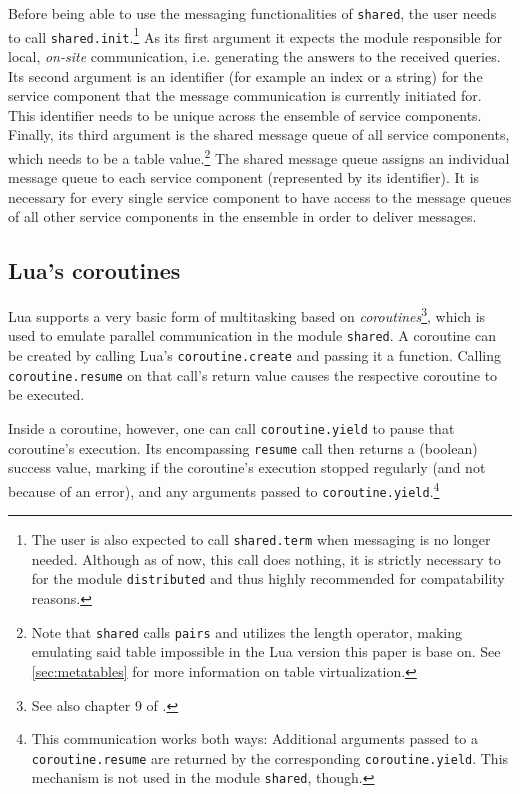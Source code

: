 \pagebreak

Before being able to use the messaging functionalities of \texttt{shared}, the user needs to call \texttt{shared.init}.\footnote{The user is also expected to call \texttt{shared.term} when messaging is no longer needed. Although as of now, this call does nothing, it is strictly necessary to for the module \texttt{distributed} and thus highly recommended for compatability reasons.} As its first argument it expects the module responsible for local, \emph{on-site} communication, i.e. generating the answers to the received queries. Its second argument is an identifier (for example an index or a string) for the service component that the message communication is currently initiated for. This identifier needs to be unique across the ensemble of service components. Finally, its third argument is the shared message queue of all service components, which needs to be a table value.\footnote{Note that \texttt{shared} calls \texttt{pairs} and utilizes the length operator, making emulating said table impossible in the Lua version this paper is base on. See \ref{sec:metatables} for more information on table virtualization.} The shared message queue assigns an individual message queue to each service component (represented by its identifier). It is necessary for every single service component to have access to the message queues of all other service components in the ensemble in order to deliver messages.

\begin{comment}
Include crossreference to POEM
\end{comment}

\subsection{Lua's coroutines}

Lua supports a very basic form of multitasking based on \emph{coroutines}\footnote{See also chapter 9 of \cite{Ierusalimschy2006}.}, which is used to emulate parallel communication in the module \texttt{shared}. A coroutine can be created by calling Lua's \texttt{coroutine.create} and passing it a function. Calling \texttt{coroutine.resume} on that call's return value causes the respective coroutine to be executed.

Inside a coroutine, however, one can call \texttt{coroutine.yield} to pause that coroutine's execution. Its encompassing \texttt{resume} call then returns a (boolean) success value, marking if the coroutine's execution stopped regularly (and not because of an error), and any arguments passed to \texttt{coroutine.yield}.\footnote{This communication works both ways: Additional arguments passed to a \texttt{coroutine.resume} are returned by the corresponding \texttt{coroutine.yield}. This mechanism is not used in the module \texttt{shared}, though.}

